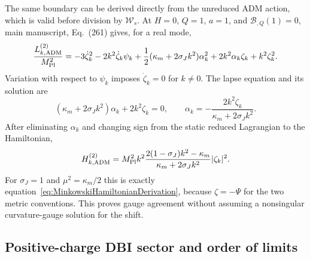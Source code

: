 \documentclass[aps,prd,reprint,onecolumn,notitlepage,nofootinbib,longbibliography,floatfix]{revtex4-2}
\theoremstyle{scstyle}
\theoremstyle{definition}
\theoremstyle{remark}
\newcommand{\mpl}{M_{\rm Pl}}
\newcommand{\cB}{\mathcal B}
\begin{document}
The same boundary can be derived directly from the unreduced ADM action, which is valid before division by $\mathcal W_s$. At $H=0$, $Q=1$, $a=1$, and $\cB_{,Q}(1)=0$, main manuscript, Eq.~(261) gives, for a real mode,
\begin{equation}
\frac{L_{k,\rm ADM}^{(2)}}{\mpl^2}
=-3\dot\zeta_k^2-2k^2\dot\zeta_k\psi_k
+\frac12(\kappa_m+2\sigma_Jk^2)\alpha_k^2
+2k^2\alpha_k\zeta_k+k^2\zeta_k^2.
\label{eq:MinkowskiADMDerivationL}
\end{equation}
Variation with respect to $\psi_k$ imposes $\dot\zeta_k=0$ for $k\ne0$. The lapse equation and its solution are
\begin{equation}
(\kappa_m+2\sigma_Jk^2)\alpha_k+2k^2\zeta_k=0,
\qquad
\alpha_k=-\frac{2k^2\zeta_k}{\kappa_m+2\sigma_Jk^2}.
\label{eq:MinkowskiADMDerivationConstraint}
\end{equation}
After eliminating $\alpha_k$ and changing sign from the static reduced Lagrangian to the Hamiltonian,
\begin{equation}
H_{k,\rm ADM}^{(2)}
=\mpl^2k^2
\frac{2(1-\sigma_J)k^2-\kappa_m}
{\kappa_m+2\sigma_Jk^2}|\zeta_k|^2.
\label{eq:MinkowskiADMDerivationH}
\end{equation}
For $\sigma_J=1$ and $\mu^2=\kappa_m/2$ this is exactly equation~\eqref{eq:MinkowskiHamiltonianDerivation}, because $\zeta=-\Psi$ for the two metric conventions. This proves gauge agreement without assuming a nonsingular curvature-gauge solution for the shift.

\subsection{Positive-charge DBI sector and order of limits}
\end{document}
